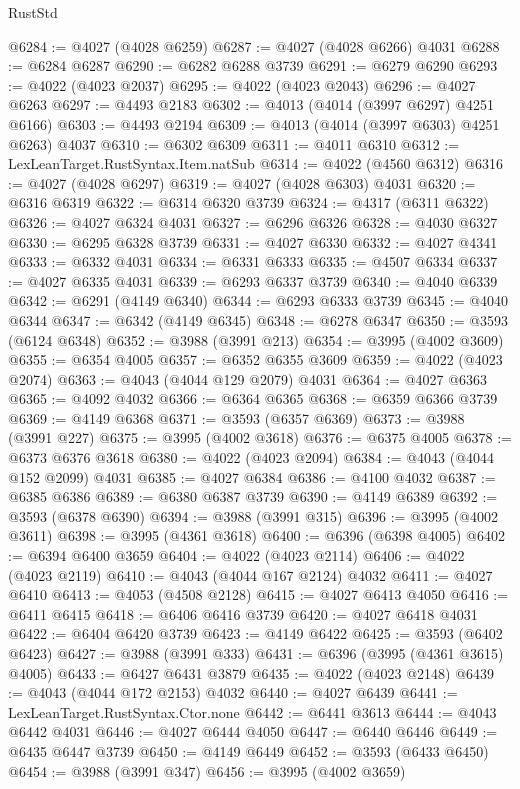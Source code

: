 \begin{lexlean}{RustStd}
\begin{coremodule}
@6284 := @4027 (@4028 @6259)
@6287 := @4027 (@4028 @6266) @4031
@6288 := @6284 @6287
@6290 := @6282 @6288 @3739
@6291 := @6279 @6290
@6293 := @4022 (@4023 @2037)
@6295 := @4022 (@4023 @2043)
@6296 := @4027 @6263
@6297 := @4493 @2183
@6302 := @4013 (@4014 (@3997 @6297) @4251 @6166)
@6303 := @4493 @2194
@6309 := @4013 (@4014 (@3997 @6303) @4251 @6263) @4037
@6310 := @6302 @6309
@6311 := @4011 @6310
@6312 := LexLeanTarget.RustSyntax.Item.natSub
@6314 := @4022 (@4560 @6312)
@6316 := @4027 (@4028 @6297)
@6319 := @4027 (@4028 @6303) @4031
@6320 := @6316 @6319
@6322 := @6314 @6320 @3739
@6324 := @4317 (@6311 @6322)
@6326 := @4027 @6324 @4031
@6327 := @6296 @6326
@6328 := @4030 @6327
@6330 := @6295 @6328 @3739
@6331 := @4027 @6330
@6332 := @4027 @4341
@6333 := @6332 @4031
@6334 := @6331 @6333
@6335 := @4507 @6334
@6337 := @4027 @6335 @4031
@6339 := @6293 @6337 @3739
@6340 := @4040 @6339
@6342 := @6291 (@4149 @6340)
@6344 := @6293 @6333 @3739
@6345 := @4040 @6344
@6347 := @6342 (@4149 @6345)
@6348 := @6278 @6347
@6350 := @3593 (@6124 @6348)
@6352 := @3988 (@3991 @213)
@6354 := @3995 (@4002 @3609)
@6355 := @6354 @4005
@6357 := @6352 @6355 @3609
@6359 := @4022 (@4023 @2074)
@6363 := @4043 (@4044 @129 @2079) @4031
@6364 := @4027 @6363
@6365 := @4092 @4032
@6366 := @6364 @6365
@6368 := @6359 @6366 @3739
@6369 := @4149 @6368
@6371 := @3593 (@6357 @6369)
@6373 := @3988 (@3991 @227)
@6375 := @3995 (@4002 @3618)
@6376 := @6375 @4005
@6378 := @6373 @6376 @3618
@6380 := @4022 (@4023 @2094)
@6384 := @4043 (@4044 @152 @2099) @4031
@6385 := @4027 @6384
@6386 := @4100 @4032
@6387 := @6385 @6386
@6389 := @6380 @6387 @3739
@6390 := @4149 @6389
@6392 := @3593 (@6378 @6390)
@6394 := @3988 (@3991 @315)
@6396 := @3995 (@4002 @3611)
@6398 := @3995 (@4361 @3618)
@6400 := @6396 (@6398 @4005)
@6402 := @6394 @6400 @3659
@6404 := @4022 (@4023 @2114)
@6406 := @4022 (@4023 @2119)
@6410 := @4043 (@4044 @167 @2124) @4032
@6411 := @4027 @6410
@6413 := @4053 (@4508 @2128)
@6415 := @4027 @6413 @4050
@6416 := @6411 @6415
@6418 := @6406 @6416 @3739
@6420 := @4027 @6418 @4031
@6422 := @6404 @6420 @3739
@6423 := @4149 @6422
@6425 := @3593 (@6402 @6423)
@6427 := @3988 (@3991 @333)
@6431 := @6396 (@3995 (@4361 @3615) @4005)
@6433 := @6427 @6431 @3879
@6435 := @4022 (@4023 @2148)
@6439 := @4043 (@4044 @172 @2153) @4032
@6440 := @4027 @6439
@6441 := LexLeanTarget.RustSyntax.Ctor.none
@6442 := @6441 @3613
@6444 := @4043 @6442 @4031
@6446 := @4027 @6444 @4050
@6447 := @6440 @6446
@6449 := @6435 @6447 @3739
@6450 := @4149 @6449
@6452 := @3593 (@6433 @6450)
@6454 := @3988 (@3991 @347)
@6456 := @3995 (@4002 @3659)

\end{coremodule}
\end{lexlean}
